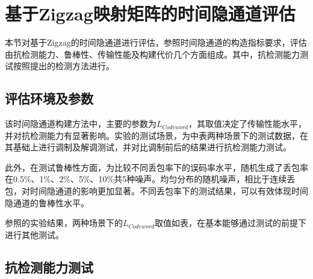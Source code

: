 \section{基于Zigzag映射矩阵的时间隐通道评估}
\label{chap:zigzag:results}
本节对基于Zigzag的时间隐通道进行评估，参照时间隐通道的构造指标要求，评估由抗检测能力、鲁棒性、传输性能及构建代价几个方面组成。其中，抗检测能力测试按照提出的检测方法进行。

\subsection{评估环境及参数}
\label{chap:zigzag:results:environment}
该时间隐通道构建方法中，主要的参数为$L_{Codeword}$，其取值决定了传输性能水平，并对抗检测能力有显著影响。实验的测试场景，为中表两种场景下的测试数据，在其基础上进行调制及解调测试，并对比调制前后的结果进行抗检测能力测试。

此外，在测试鲁棒性方面，为比较不同丢包率下的误码率水平，随机生成了丢包率在0.5\%、1\%、2\%、5\%、10\%共5种噪声。均匀分布的随机噪声，相比于连续丢包，对时间隐通道的影响更加显著。不同丢包率下的测试结果，可以有效体现时间隐通道的鲁棒性水平。


参照的实验结果，两种场景下的$L_{Codeword}$取值如表，在基本能够通过测试的前提下进行其他测试。

\subsection{抗检测能力测试}
\label{chap:zigzag:results:undetectability}

